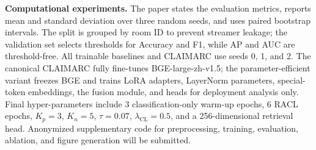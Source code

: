\documentclass[letterpaper]{article}
\begin{document}
\textbf{Computational experiments.} The paper states the evaluation metrics, reports mean and standard deviation over three random seeds, and uses paired bootstrap intervals. The split is grouped by room ID to prevent streamer leakage; the validation set selects thresholds for Accuracy and F1, while AP and AUC are threshold-free. All trainable baselines and CLAIMARC use seeds 0, 1, and 2. The canonical CLAIMARC fully fine-tunes BGE-large-zh-v1.5; the parameter-efficient variant freezes BGE and trains LoRA adapters, LayerNorm parameters, special-token embeddings, the fusion module, and heads for deployment analysis only. Final hyper-parameters include 3 classification-only warm-up epochs, 6 RACL epochs, $K_p{=}3$, $K_n{=}5$, $\tau{=}0.07$, $\lambda_{\mathrm{CL}}{=}0.5$, and a 256-dimensional retrieval head. Anonymized supplementary code for preprocessing, training, evaluation, ablation, and figure generation will be submitted.
\end{document}
